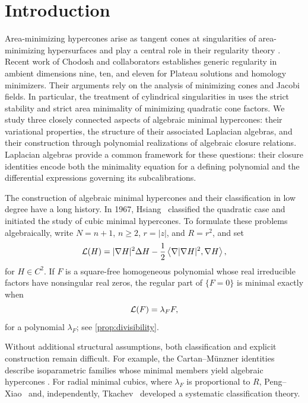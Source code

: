 \section{Introduction}

Area-minimizing hypercones arise as tangent cones at singularities of
area-minimizing hypersurfaces and play a central role in their regularity
theory \cite{HardtSimon85,Simon94,Szekelyhidi26,FiresterTsiamisWang26}.
Recent work of Chodosh and collaborators \cite{CMS26,CMSW25}
establishes generic regularity in ambient dimensions nine, ten, and eleven
for Plateau solutions and homology minimizers. Their arguments rely on
the analysis of minimizing cones and Jacobi fields. In particular, the
treatment of cylindrical singularities in \cite{CMSW25} uses the strict
stability and strict area minimality of minimizing quadratic cone factors.
We study three closely connected aspects of algebraic minimal hypercones:
their variational properties, the structure of their associated Laplacian
algebras, and their construction through polynomial realizations of
algebraic closure relations. Laplacian algebras provide a common framework
for these questions: their closure identities encode both the minimality
equation for a defining polynomial and the differential expressions
governing its subcalibrations.

The construction of algebraic minimal hypercones and their classification
in low degree have a long history. In 1967, Hsiang~\cite{Hsiang67}
classified the quadratic case and initiated the study of cubic minimal
hypercones. To formulate these problems algebraically, write
\(N=n+1\), \(n\geq2\), \(r=|z|\), and \(R=r^2\), and set
\begin{equation}\label{eq:L-definition}
 \mathcal L(H)=|\nabla H|^2\Delta H
 -\frac12\left\langle\nabla|\nabla H|^2,\nabla H\right\rangle,
\end{equation}
for \(H\in C^2\). If \(F\) is a square-free homogeneous polynomial
whose real irreducible factors have nonsingular real zeros,
the regular part of \(\{F=0\}\) is minimal exactly when
\begin{equation}\label{eq:intro-minimality}
 \mathcal L(F)=\lambda_FF,
\end{equation}
for a polynomial \(\lambda_F\); see \cref{prop:divisibility}.

Without additional structural assumptions, both classification and
explicit construction remain difficult. For example, the
Cartan--M\"unzner identities describe
isoparametric families whose minimal members yield algebraic hypercones
\cite{Muenzer80,Muenzer81}. For radial minimal cubics, where
\(\lambda_F\) is proportional to \(R\), Peng--Xiao~\cite{PengXiao93} and, independently,
Tkachev~\cite{TkachevClassification10,TkachevClifford10}
developed a systematic classification theory.


